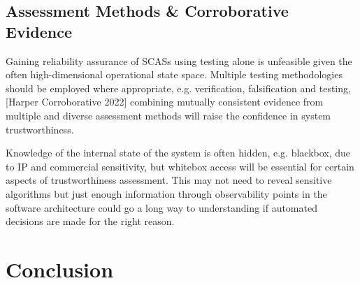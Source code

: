 \subsection{Assessment Methods \& Corroborative Evidence}
Gaining reliability assurance of SCASs using testing alone is unfeasible given the often high-dimensional operational state space. Multiple testing methodologies should be employed where appropriate, e.g. verification, falsification and testing, [Harper Corroborative 2022] combining mutually consistent evidence from multiple and diverse assessment methods will raise the confidence in system trustworthiness.

Knowledge of the internal state of the system is often hidden, e.g. blackbox, due to IP and commercial sensitivity, but whitebox access will be essential for certain aspects of trustworthiness assessment. This may not need to reveal sensitive algorithms but just enough information through observability points in the software architecture could go a long way to understanding if automated decisions are made for the right reason\cite{koopman2018toward}. 



\section{Conclusion}\label{conclusion}
